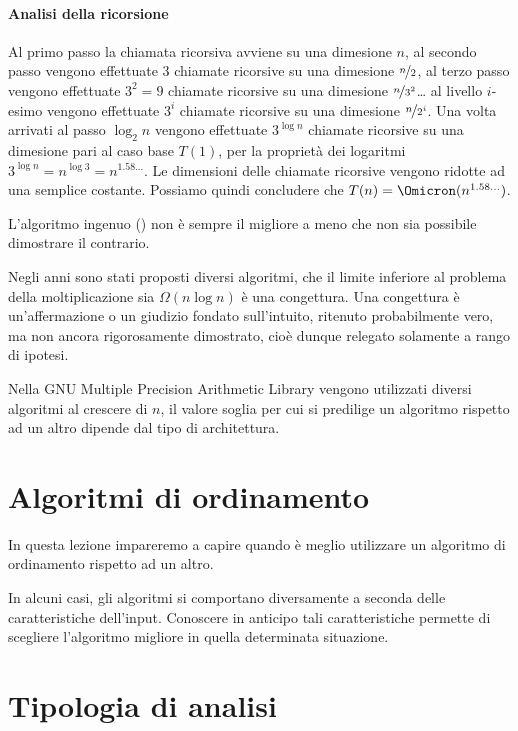 \paragraph{Analisi della ricorsione}
Al primo passo la chiamata ricorsiva avviene su una dimesione \(n\), al secondo passo vengono effettuate \(3\) chiamate ricorsive su una dimesione \(\nicefrac{n}{2}\), al terzo passo vengono effettuate \(3^2 = 9\) chiamate ricorsive su una dimesione \(\nicefrac{n}{3^2}\)\dots
al livello \(i\)-esimo vengono effettuate \(3^i\) chiamate ricorsive su una dimesione \(\nicefrac{n}{2^i}\).
Una volta arrivati al passo \(\log_2 n\) vengono effettuate \(3^{\log n}\) chiamate ricorsive su una dimesione pari al caso base \(T(1)\), per la proprietà dei logaritmi \(3^{\log n} = n^{\log 3} = n^{1.58\dots}\).
Le dimensioni delle chiamate ricorsive vengono ridotte ad una semplice costante.
Possiamo quindi concludere che \(T(n) = \Omicron(n^{1.58\dots})\).

\begin{note}
L'algoritmo ingenuo () non è sempre il migliore a meno che non sia possibile dimostrare il contrario.
\end{note}

Negli anni sono stati proposti diversi algoritmi, che il limite inferiore al problema della moltiplicazione sia \(\Omega(n \log n)\) è una congettura.
Una congettura è un'affermazione o un giudizio fondato sull'intuito, ritenuto probabilmente vero, ma non ancora rigorosamente dimostrato, cioè dunque relegato solamente a rango di ipotesi.

Nella GNU Multiple Precision Arithmetic Library vengono utilizzati diversi algoritmi al crescere di \(n\), il valore soglia per cui si predilige un algoritmo rispetto ad un altro dipende dal tipo di architettura.

\clearpage
\section{Algoritmi di ordinamento}

In questa lezione impareremo a capire quando è meglio utilizzare un algoritmo di ordinamento rispetto ad un altro.

In alcuni casi, gli algoritmi si comportano diversamente a seconda delle caratteristiche dell'input.
Conoscere in anticipo tali caratteristiche permette di scegliere l'algoritmo migliore in quella determinata situazione.

\section*{Tipologia di analisi}

